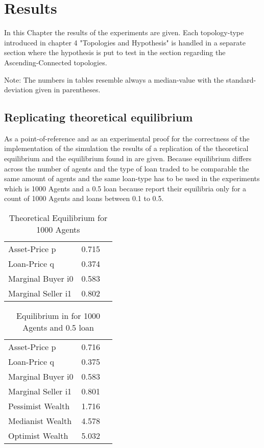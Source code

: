 \documentclass[Bachelorarbeit.tex]{subfiles}
\begin{document}
\graphicspath{{./figures/results/}}	%

\chapter{Results}
In this Chapter the results of the experiments are given. Each topology-type introduced in chapter 4 "Topologies and Hypothesis" is handled in a separate section where the hypothesis is put to test in the section regarding the Ascending-Connected topologies.

Note: The numbers in tables resemble always a median-value with the standard-deviation given in parentheses.

\section{Replicating theoretical equilibrium}
As  a point-of-reference and as an experimental proof for the correctness of the implementation of the simulation the results of a replication of the theoretical equilibrium and the equilibrium found in \cite{Breuer2015} are given.
Because equilibrium differs across the number of agents and the type of loan traded to be comparable the same amount of agents and the same loan-type has to be used in the experiments which is 1000 Agents and a 0.5 loan because \cite{Breuer2015} report their equilibria only for a count of 1000 Agents and loans between 0.1 to 0.5.

\begin{table}[h]
	\centering
	\caption{Theoretical Equilibrium for 1000 Agents}
	\begin{tabular} { l c r }
		\hline
		Asset-Price p & 0.715 \\
		Loan-Price q & 0.374 \\
		Marginal Buyer i0 & 0.583 \\
		Marginal Seller i1 & 0.802 \\
		\hline
	\end{tabular}
\end{table}


\begin{table}[h]
	\centering
	\caption{Equilibrium in \cite{Breuer2015} for 1000 Agents and 0.5 loan }
	\begin{tabular} { l c r }
		\hline
		Asset-Price p & 0.716 \\
		Loan-Price q & 0.375 \\
		Marginal Buyer i0 & 0.583 \\
		Marginal Seller i1 & 0.801 \\
		Pessimist Wealth & 1.716 \\
		Medianist Wealth & 4.578 \\
		Optimist Wealth & 5.032 \\
		\hline
	\end{tabular}
\end{table}
\end{document}
